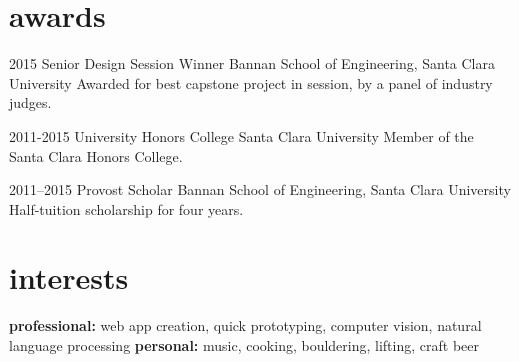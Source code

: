\documentclass[]{friggeri-cv} %
\begin{document}

\section{awards}

\begin{entrylist}

\entry
{2015}
{Senior Design Session Winner}
{Bannan School of Engineering, Santa Clara University}
{Awarded for best capstone project in session, by a panel of industry judges.}

\entry
{2011-2015}
{University Honors College}
{Santa Clara University}
{Member of the Santa Clara Honors College.}

\entry
{2011--2015}
{Provost Scholar}
{Bannan School of Engineering, Santa Clara University}
{Half-tuition scholarship for four years.}


\end{entrylist}


\section{interests}

\textbf{professional:} web app creation, quick prototyping, computer vision, natural language processing \textbf{personal:} music, cooking, bouldering, lifting, craft beer 
\end{document}
